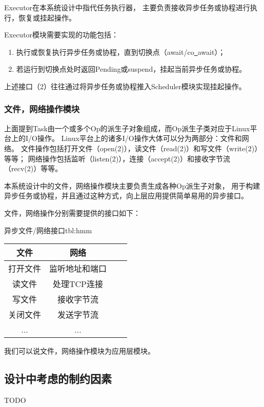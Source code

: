 \documentclass[supercite]{HustGraduPaper}
\theoremstyle{definition}
\begin{document}
Executor在本系统设计中指代任务执行器，
主要负责接收异步任务或协程进行执行，恢复或挂起操作。\par

Executor模块需要实现的功能包括：

\begin{enumerate}
  \item 执行或恢复执行异步任务或协程，直到切换点（await/co\underline{~}await）；
  \item 若运行到切换点处时返回Pending或suspend，挂起当前异步任务或协程。
\end{enumerate}

上述接口（2）往往通过将异步任务或协程推入Scheduler模块实现挂起操作。\par

\subsubsection{文件，网络操作模块}

上面提到Task由一个或多个Op的派生子对象组成，而Op派生子类对应于Linux平台上的I/O操作。
Linux平台上的诸多I/O操作大体可以分为两部分：文件和网络。
文件操作包括打开文件（open(2)），读文件（read(2)）和写文件（write(2)）等等；
网络操作包括监听（listen(2)），连接（accept(2)）和接收字节流（recv(2)）等等。\par

本系统设计中的文件，网络操作模块主要负责生成各种Op派生子对象，
用于构建异步任务或协程，并且通过这种方式，向上层应用提供简单易用的异步接口。\par

文件，网络操作分别需要提供的接口如下：

\begin{generaltab}{异步文件/网络接口}{tbl:hmm}
  \begin{tabular}{c|ccc}
    \toprule
    文件 & 网络 \\
    \midrule
    打开文件 & 监听地址和端口 \\
    读文件 & 处理TCP连接 \\
    写文件 & 接收字节流 \\
    关闭文件 & 发送字节流 \\
    ... & ... \\
    \bottomrule
  \end{tabular}
\end{generaltab}

我们可以说文件，网络操作模块为应用层模块。\par

\subsection{设计中考虑的制约因素}
TODO
\end{document}
